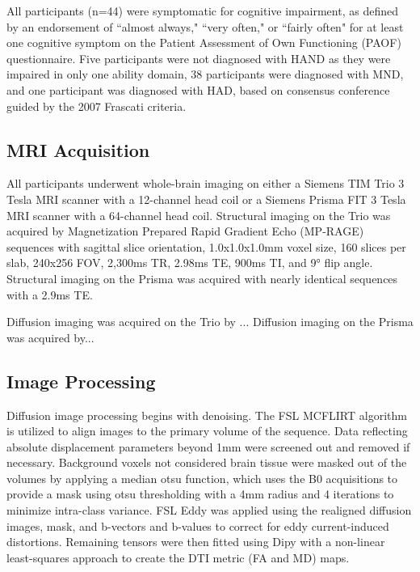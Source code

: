 \documentclass{article}
\begin{document}
All participants (n=44) were symptomatic for cognitive impairment, as defined by an endorsement of ``almost always," ``very often," or ``fairly often" for at least one cognitive symptom on the Patient Assessment of Own Functioning (PAOF) questionnaire. Five participants were not diagnosed with HAND as they were impaired in only one ability domain, 38 participants were diagnosed with MND, and one participant was diagnosed with HAD, based on consensus conference guided by the 2007 Frascati criteria.\cite{Antinori2007UpdatedDisorders.} 

\subsection{MRI Acquisition}
All participants underwent whole-brain imaging on either a Siemens TIM Trio 3 Tesla MRI scanner with a 12-channel head coil or a Siemens Prisma FIT 3 Tesla MRI scanner with a 64-channel head coil. Structural imaging on the Trio was acquired by Magnetization Prepared Rapid Gradient Echo (MP-RAGE) sequences with sagittal slice orientation, 1.0x1.0x1.0mm voxel size, 160 slices per slab, 240x256 FOV, 2,300ms TR, 2.98ms TE, 900ms TI, and \ang{9} flip angle. Structural imaging on the Prisma was acquired with nearly identical sequences with a 2.9ms TE.

Diffusion imaging was acquired on the Trio by ...
Diffusion imaging on the Prisma was acquired by...

\subsection{Image Processing}
Diffusion image processing begins with denoising.\cite{Veraart2016DenoisingTheory.} The FSL MCFLIRT algorithm is utilized to align images to the primary volume of the sequence.\cite{Jenkinson2002ImprovedImages.} Data reflecting absolute displacement parameters beyond 1mm were screened out and removed if necessary. Background voxels not considered brain tissue were masked out of the volumes by applying a median otsu function, which uses the B0 acquisitions to provide a mask using otsu thresholding with a 4mm radius and 4 iterations to minimize intra-class variance.\cite{Garyfallidis2014DipyData} FSL Eddy was applied using the realigned diffusion images, mask, and b-vectors and b-values to correct for eddy current-induced distortions.\cite{Andersson2016AnImaging.} Remaining tensors were then fitted using Dipy with a non-linear least-squares approach to create the DTI metric (FA and MD) maps.\cite{Garyfallidis2014DipyData}
\end{document}
